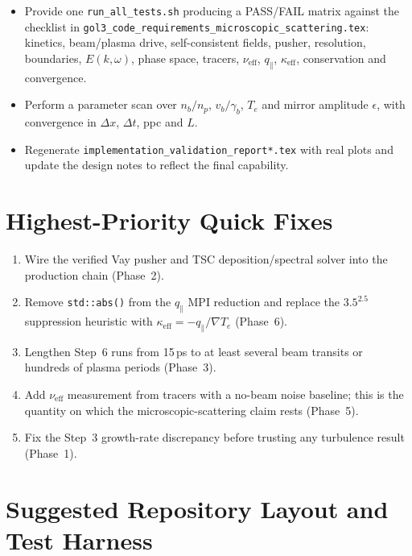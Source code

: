 \documentclass[11pt,a4paper]{article}
\begin{document}
\begin{itemize}[leftmargin=*]
  \item Provide one \texttt{run\_all\_tests.sh} producing a PASS/FAIL matrix against the checklist
        in \texttt{gol3\_code\_requirements\_microscopic\_scattering.tex}: kinetics, beam/plasma
        drive, self-consistent fields, pusher, resolution, boundaries, $E(k,\omega)$, phase space,
        tracers, $\nu_{\mathrm{eff}}$, $q_\parallel$, $\kappa_{\mathrm{eff}}$, conservation and
        convergence.
  \item Perform a parameter scan over $n_b/n_p$, $v_b/\gamma_b$, $T_e$ and mirror amplitude
        $\epsilon$, with convergence in $\Delta x$, $\Delta t$, ppc and $L$.
  \item Regenerate \texttt{implementation\_validation\_report*.tex} with real plots and update the
        design notes to reflect the final capability.
\end{itemize}

\section{Highest-Priority Quick Fixes}

\begin{enumerate}[leftmargin=*]
  \item Wire the verified Vay pusher and TSC deposition/spectral solver into the production chain
        (Phase~2).
  \item Remove \texttt{std::abs()} from the $q_\parallel$ MPI reduction and replace the
        $3.5^{2.5}$ suppression heuristic with $\kappa_{\mathrm{eff}}=-q_\parallel/\nabla T_e$
        (Phase~6).
  \item Lengthen Step~6 runs from 15\,ps to at least several beam transits or hundreds of plasma
        periods (Phase~3).
  \item Add $\nu_{\mathrm{eff}}$ measurement from tracers with a no-beam noise baseline; this is
        the quantity on which the microscopic-scattering claim rests (Phase~5).
  \item Fix the Step~3 growth-rate discrepancy before trusting any turbulence result (Phase~1).
\end{enumerate}

\section{Suggested Repository Layout and Test Harness}
\end{document}

